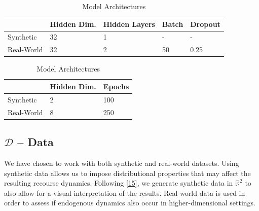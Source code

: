 \documentclass[
  conference]{IEEEtran}
\begin{document}
\begin{table}

\caption{\label{tbl-panel}Model
Architectures}\begin{minipage}[t]{\linewidth}

{\centering 

\begin{tabular}[t]{lllll}
\toprule
 & Hidden Dim. & Hidden Layers & Batch & Dropout\\
\midrule
Synthetic & 32 & 1 & - & -\\
Real-World & 32 & 2 & 50 & 0.25\\
\bottomrule
\end{tabular}

}

\end{minipage}%
\newline
\begin{minipage}[t]{\linewidth}

{\centering 

\begin{tabular}[t]{lll}
\toprule
 & Hidden Dim. & Epochs\\
\midrule
Synthetic & 2 & 100\\
Real-World & 8 & 250\\
\bottomrule
\end{tabular}

}

\end{minipage}%

\end{table}

\hypertarget{sec-empirical-data}{%
\subsection{\texorpdfstring{\(\mathcal{D}\) --
Data}{\textbackslash mathcal\{D\} -- Data}}\label{sec-empirical-data}}

We have chosen to work with both synthetic and real-world datasets.
Using synthetic data allows us to impose distributional properties that
may affect the resulting recourse dynamics. Following
\protect\hyperlink{ref-upadhyay2021towards}{{[}15{]}}, we generate
synthetic data in \(\mathbb{R}^2\) to also allow for a visual
interpretation of the results. Real-world data is used in order to
assess if endogenous dynamics also occur in higher-dimensional settings.
\end{document}
